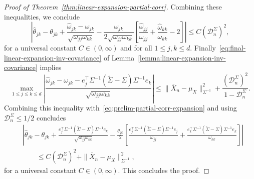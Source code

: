 \documentclass[11pt]{article}
\begin{document}
\begin{appendices}
\begin{proof}[Proof of Theorem~\ref{thm:linear-expansion-partial-corr}]
Combining these inequalities, we conclude
\begin{equation}\label{eq:prelim-partial-corr-expansion}
\left|\widehat{\theta}_{jk} - \theta_{jk} + \frac{\widehat{\omega}_{jk} - \omega_{jk}}{\sqrt{{\omega}_{jj}{\omega}_{kk}}} - \frac{\omega_{jk}}{2\sqrt{{\omega}_{jj}{\omega}_{kk}}}\left[\frac{\widehat{\omega}_{jj}}{\omega_{jj}} + \frac{\widehat{\omega}_{kk}}{\omega_{kk}} - 2\right]\right| \le C(\mathcal{D}_n^{\Sigma})^2,
\end{equation}
for a universal constant $C \in (0, \infty)$ and for all $1\le j, k\le d$.
Finally~\eqref{eq:final-linear-expansion-inv-covariance} of Lemma~\ref{lemma:linear-expansion-inv-covariance} implies
\[
\max_{1\le j\le k \le d}\left|\frac{\widehat{\omega}_{jk} - \omega_{jk} - e_j^{\top}\Sigma^{-1}(\widetilde{\Sigma} - \Sigma)\Sigma^{-1}e_k}{\sqrt{\omega_{jj}\omega_{kk}}}\right| \le \|\overline{X}_n - \mu_X\|_{\Sigma^{-1}}^2 + \frac{(\mathcal{D}_n^{\Sigma})^2}{1 - \mathcal{D}_n^{\Sigma}}.
\]
Combining this inequality with~\eqref{eq:prelim-partial-corr-expansion} and using $\mathcal{D}_n^{\Sigma} \le 1/2$ concludes
\begin{align*}
&\left|\widehat{\theta}_{jk} - \theta_{jk} + \frac{e_j^{\top}\Sigma^{-1}(\widetilde{\Sigma} - \Sigma)\Sigma^{-1}e_k}{\sqrt{\omega_{jj}\omega_{kk}}} - \frac{\theta_{jk}}{2}\left[\frac{e_j^{\top}\Sigma^{-1}(\widetilde{\Sigma} - \Sigma)\Sigma^{-1}e_j}{\omega_{jj}} + \frac{e_k^{\top}\Sigma^{-1}(\widetilde{\Sigma} - \Sigma)\Sigma^{-1}e_k}{\omega_{kk}}\right]\right|\\
&\qquad\le C(\mathcal{D}_n^{\Sigma})^2 + \|\overline{X}_n - \mu_X\|_{\Sigma^{-1}}^2,
\end{align*}
for a universal constant $C \in (0, \infty)$. This concludes the proof.
\end{proof}




\end{appendices}
\end{document}

